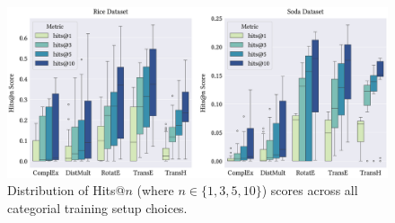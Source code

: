 \begin{figure}[!b]
    \centering
    \includegraphics[width=1\textwidth]{figures/hits@10_across_all_models.eps}
    \caption{Distribution of Hits@$n$ (where $n \in \{1, 3, 5, 10\}$) scores across all categorial training setup choices.} \label{hits@10_across_all_models}
\end{figure}
